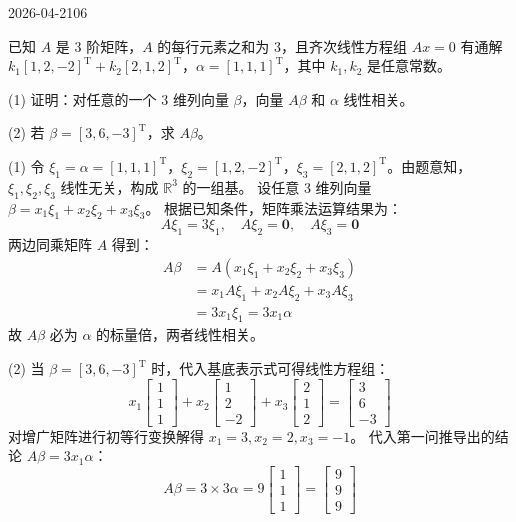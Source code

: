 \begin{mistake}{2026-04-21}{06}

\begin{problemcontent}
已知 \(A\) 是 3 阶矩阵，\(A\) 的每行元素之和为 3，且齐次线性方程组 \(Ax=0\) 有通解 \(k_1[1, 2, -2]^{\mathrm{T}} + k_2[2, 1, 2]^{\mathrm{T}}\)，\(\alpha = [1, 1, 1]^{\mathrm{T}}\)，其中 \(k_1, k_2\) 是任意常数。

(1) 证明：对任意的一个 3 维列向量 \(\beta\)，向量 \(A\beta\) 和 \(\alpha\) 线性相关。

(2) 若 \(\beta = [3, 6, -3]^{\mathrm{T}}\)，求 \(A\beta\)。
\end{problemcontent}

\begin{solutioncontent}
(1) 令 \(\xi_1 = \alpha = [1, 1, 1]^{\mathrm{T}}\)，\(\xi_2 = [1, 2, -2]^{\mathrm{T}}\)，\(\xi_3 = [2, 1, 2]^{\mathrm{T}}\)。由题意知，\(\xi_1, \xi_2, \xi_3\) 线性无关，构成 \(\mathbb{R}^3\) 的一组基。
设任意 3 维列向量 \(\beta = x_1\xi_1 + x_2\xi_2 + x_3\xi_3\)。
根据已知条件，矩阵乘法运算结果为：
\[
A\xi_1 = 3\xi_1, \quad A\xi_2 = \mathbf{0}, \quad A\xi_3 = \mathbf{0}
\]
两边同乘矩阵 \(A\) 得到：
\[
\begin{aligned}
A\beta &= A(x_1\xi_1 + x_2\xi_2 + x_3\xi_3) \\
&= x_1A\xi_1 + x_2A\xi_2 + x_3A\xi_3 \\
&= 3x_1\xi_1 = 3x_1\alpha
\end{aligned}
\]
故 \(A\beta\) 必为 \(\alpha\) 的标量倍，两者线性相关。

(2) 当 \(\beta = [3, 6, -3]^{\mathrm{T}}\) 时，代入基底表示式可得线性方程组：
\[
x_1 \begin{bmatrix} 1 \\ 1 \\ 1 \end{bmatrix} + x_2 \begin{bmatrix} 1 \\ 2 \\ -2 \end{bmatrix} + x_3 \begin{bmatrix} 2 \\ 1 \\ 2 \end{bmatrix} = \begin{bmatrix} 3 \\ 6 \\ -3 \end{bmatrix}
\]
对增广矩阵进行初等行变换解得 \(x_1 = 3, x_2 = 2, x_3 = -1\)。
代入第一问推导出的结论 \(A\beta = 3x_1\alpha\)：
\[
A\beta = 3 \times 3 \alpha = 9 \begin{bmatrix} 1 \\ 1 \\ 1 \end{bmatrix} = \begin{bmatrix} 9 \\ 9 \\ 9 \end{bmatrix}
\]
\end{solutioncontent}


\end{mistake}
